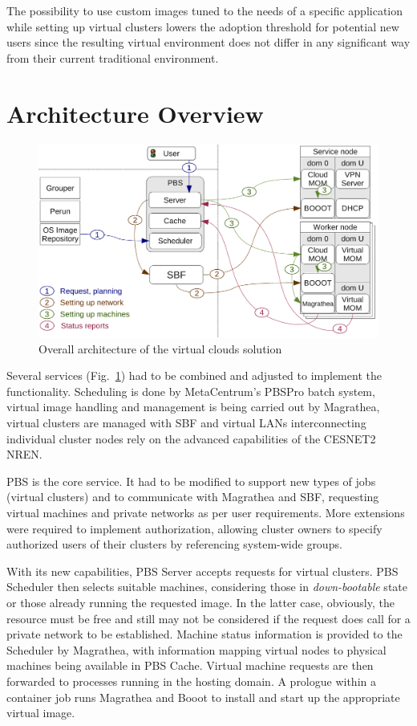 \documentclass[a4paper]{article}
\begin{document}
The possibility to use custom images tuned to the needs of a specific application while setting up virtual clusters lowers the adoption threshold for potential new
users since the resulting virtual environment does not differ in any significant way from their current traditional environment.

\section{Architecture Overview}
\label{Architecture}

\begin{figure}[htb]
\begin{center}
    \includegraphics[width=.8\columnwidth]{cloud_arch.pdf}
\end{center}
    \caption{Overall architecture of the virtual clouds solution}
    \label{fig:architecture}
\end{figure}

Several services (Fig.~\ref{fig:architecture}) had to be combined and adjusted to implement the functionality. Scheduling is done by MetaCentrum's PBSPro batch system, virtual image
handling and management is being carried out by Magrathea, virtual clusters are managed with SBF and virtual LANs interconnecting individual cluster nodes
rely on the advanced capabilities of the CESNET2 NREN.

PBS is the core service. It had to be modified to support new types of jobs (virtual clusters) and to communicate with Magrathea and SBF, requesting virtual machines and private networks as per user requirements. More extensions were required to implement authorization, allowing cluster owners to specify authorized users of their clusters by referencing system-wide groups.

With its new capabilities, PBS Server accepts requests for virtual
clusters. PBS Scheduler then selects suitable machines, considering those
in \emph{down-bootable} state or those already running the requested image.
In the latter case, obviously, the resource must be free and still may not
be considered if the request does call for a private network to be
established. Machine status information is provided to the Scheduler by
Magrathea, with information mapping virtual nodes to physical machines
being available in PBS Cache. Virtual machine requests are then forwarded
to processes running in the hosting domain. A prologue within a container job runs Magrathea and Booot to install and start up the appropriate virtual image.
\end{document}
